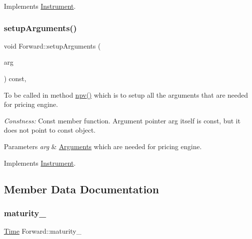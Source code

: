 Implements \hyperlink{class_instrument_a381f093402f789ad7c0ffecd233167dc}{Instrument}.

\hypertarget{class_forward_a909ab0cefa0ab42bdaf3bf6e84ac0096}{}\label{class_forward_a909ab0cefa0ab42bdaf3bf6e84ac0096} 
\subsubsection{\texorpdfstring{setup\+Arguments()}{setupArguments()}}
{\footnotesize\ttfamily void Forward\+::setup\+Arguments (\begin{DoxyParamCaption}\item[{\hyperlink{class_pricing_engine_1_1_arguments}{Pricing\+Engine\+::\+Arguments} $\ast$const}]{arg }\end{DoxyParamCaption}) const\hspace{0.3cm}{\ttfamily [override]}, {\ttfamily [virtual]}}



To be called in method \hyperlink{class_instrument_aa750f2ae95a21d65a073da3171e8d084}{npv()} which is to setup all the arguments that are needed for pricing engine. 

{\itshape Constness\+:} Const member function. Argument pointer arg itself is const, but it does not point to const object. 
\begin{DoxyParams}{Parameters}
{\em arg} & \hyperlink{class_forward_1_1_arguments}{Arguments} which are needed for pricing engine. \\
\hline
\end{DoxyParams}


Implements \hyperlink{class_instrument_a5cd384be384fe415f09ecc78e2a87539}{Instrument}.



\subsection{Member Data Documentation}
\hypertarget{class_forward_ad599104a13c33fbf31e9214af904e9aa}{}\label{class_forward_ad599104a13c33fbf31e9214af904e9aa} 
\subsubsection{\texorpdfstring{maturity\+\_\+}{maturity\_}}
{\footnotesize\ttfamily \hyperlink{_name_def_8h_ac2d3e0ba793497bcca555c7c2cf64ff3}{Time} Forward\+::maturity\+\_\+\hspace{0.3cm}{\ttfamily [private]}}

